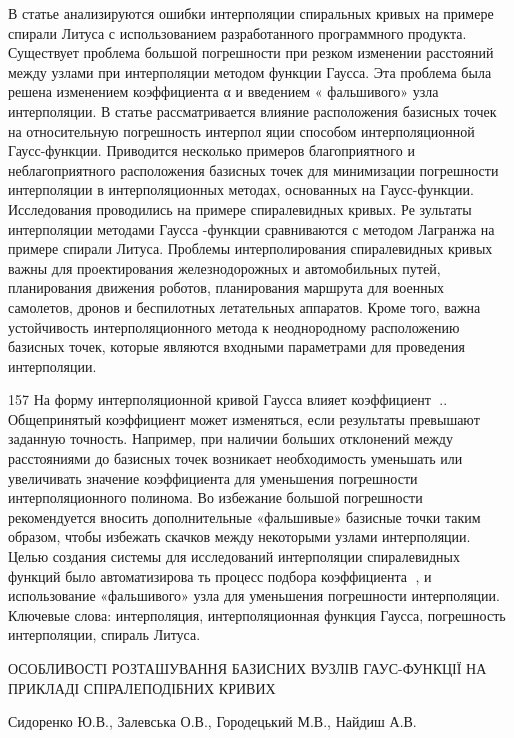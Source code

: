 \documentclass[12pt,a4paper]{article}
\begin{document}
\par
В статье анализируются ошибки интерполяции спиральных кривых на примере спирали Литуса с использованием разработанного программного продукта. Существует проблема большой погрешности при резком изменении расстояний между узлами при интерполяции методом функции Гаусса. Эта проблема была решена изменением коэффициента α и введением « фальшивого» узла интерполяции. В статье рассматривается влияние расположения базисных точек на относительную погрешность интерпол яции способом интерполяционной Гаусс-функции. Приводится несколько примеров благоприятного и неблагоприятного расположения базисных точек для минимизации погрешности интерполяции в интерполяционных методах, основанных на Гаусс-функции. Исследования проводились на примере спиралевидных кривых. Ре зультаты интерполяции методами Гаусса -функции сравниваются с методом Лагранжа на примере спирали Литуса. Проблемы интерполирования спиралевидных кривых важны для проектирования железнодорожных и автомобильных путей, планирования движения роботов, планирования маршрута для военных самолетов, дронов и беспилотных летательных аппаратов. Кроме того, важна устойчивость интерполяционного метода к неоднородному расположению базисных точек, которые являются входными параметрами для проведения интерполяции.
\par
157 На форму интерполяционной кривой Гаусса влияет коэффициент .. Общепринятый коэффициент может изменяться, если результаты превышают заданную точность. Например, при наличии больших отклонений между расстояниями до базисных точек возникает необходимость уменьшать или увеличивать значение коэффициента для уменьшения погрешности интерполяционного полинома. Во избежание большой погрешности рекомендуется вносить дополнительные «фальшивые» базисные точки таким образом, чтобы избежать скачков между некоторыми узлами интерполяции. Целью создания системы для исследований интерполяции спиралевидных функций было автоматизирова ть процесс подбора коэффициента , и использование «фальшивого» узла для уменьшения погрешности интерполяции. Ключевые слова: интерполяция, интерполяционная функция Гаусса, погрешность интерполяции, спираль Литуса.
\par
ОСОБЛИВОСТІ РОЗТАШУВАННЯ БАЗИСНИХ ВУЗЛІВ ГАУС-ФУНКЦІЇ НА ПРИКЛАДІ СПІРАЛЕПОДІБНИХ КРИВИХ
\par
Сидоренко Ю.В., Залевська О.В., Городецький М.В., Найдиш А.В.
\par
\end{document}
